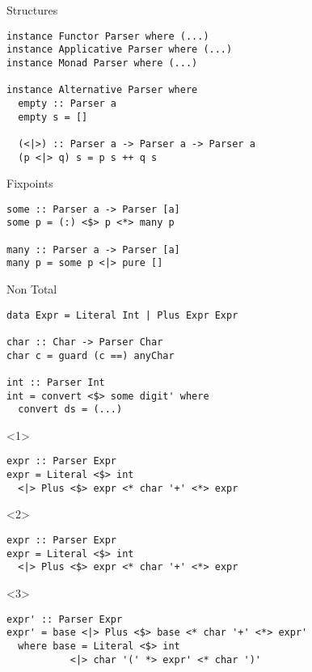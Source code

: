 \documentclass{beamer}
\begin{document}
\begin{frame}[fragile]{Structures}
\begin{verbatim}
instance Functor Parser where (...)
instance Applicative Parser where (...)
instance Monad Parser where (...)

instance Alternative Parser where
  empty :: Parser a
  empty s = []

  (<|>) :: Parser a -> Parser a -> Parser a
  (p <|> q) s = p s ++ q s
\end{verbatim}
\end{frame}

\begin{frame}[fragile]{Fixpoints}
\begin{verbatim}
some :: Parser a -> Parser [a]
some p = (:) <$> p <*> many p

many :: Parser a -> Parser [a]
many p = some p <|> pure []
\end{verbatim}
\end{frame}

\begin{frame}[fragile]{Non Total}
\begin{verbatim}
data Expr = Literal Int | Plus Expr Expr

char :: Char -> Parser Char
char c = guard (c ==) anyChar

int :: Parser Int
int = convert <$> some digit' where
  convert ds = (...)
\end{verbatim}
\begin{onlyenv}<1>
\begin{verbatim}
expr :: Parser Expr
expr = Literal <$> int
  <|> Plus <$> expr <* char '+' <*> expr
\end{verbatim}
\end{onlyenv}
\begin{onlyenv}<2>
\begin{mdframed}[backgroundcolor=lightgray]
\begin{verbatim}
expr :: Parser Expr
expr = Literal <$> int
  <|> Plus <$> expr <* char '+' <*> expr
\end{verbatim}
\end{mdframed}
\end{onlyenv}
\begin{onlyenv}<3>
\begin{verbatim}
expr' :: Parser Expr
expr' = base <|> Plus <$> base <* char '+' <*> expr'
  where base = Literal <$> int
           <|> char '(' *> expr' <* char ')'
\end{verbatim}
\end{onlyenv}
\end{frame}
\end{document}
